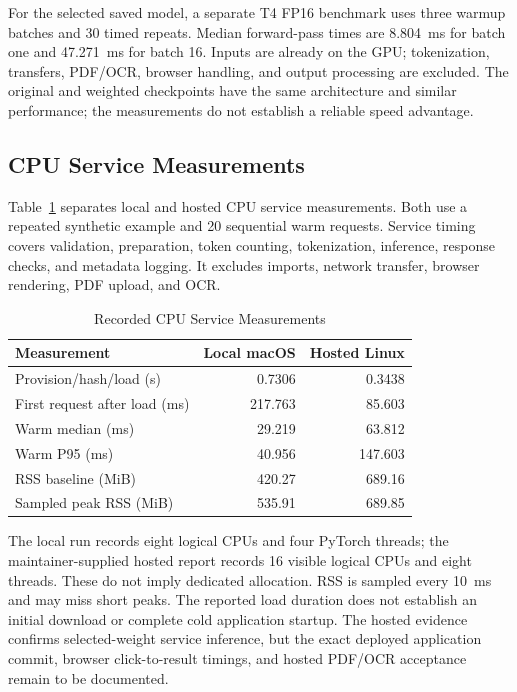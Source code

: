 \documentclass[conference,a4paper]{IEEEtran}
\begin{document}
For the selected saved model, a separate T4 FP16 benchmark uses three warmup batches and 30 timed repeats. Median forward-pass times are 8.804~ms for batch one and 47.271~ms for batch 16. Inputs are already on the GPU; tokenization, transfers, PDF/OCR, browser handling, and output processing are excluded. The original and weighted checkpoints have the same architecture and similar performance; the measurements do not establish a reliable speed advantage.

\subsection{CPU Service Measurements}
Table~\ref{tab:cpu} separates local and hosted CPU service measurements. Both use a repeated synthetic example and 20 sequential warm requests. Service timing covers validation, preparation, token counting, tokenization, inference, response checks, and metadata logging. It excludes imports, network transfer, browser rendering, PDF upload, and OCR.

\begin{table}[t]
\caption{Recorded CPU Service Measurements}
\label{tab:cpu}
\centering\footnotesize
\begin{tabular}{lrr}
\toprule
Measurement & Local macOS & Hosted Linux\\
\midrule
Provision/hash/load (s) & 0.7306 & 0.3438\\
First request after load (ms) & 217.763 & 85.603\\
Warm median (ms) & 29.219 & 63.812\\
Warm P95 (ms) & 40.956 & 147.603\\
RSS baseline (MiB) & 420.27 & 689.16\\
Sampled peak RSS (MiB) & 535.91 & 689.85\\
\bottomrule
\end{tabular}
\end{table}

The local run records eight logical CPUs and four PyTorch threads; the maintainer-supplied hosted report records 16 visible logical CPUs and eight threads. These do not imply dedicated allocation. RSS is sampled every 10~ms and may miss short peaks. The reported load duration does not establish an initial download or complete cold application startup. The hosted evidence confirms selected-weight service inference, but the exact deployed application commit, browser click-to-result timings, and hosted PDF/OCR acceptance remain to be documented.
\end{document}
